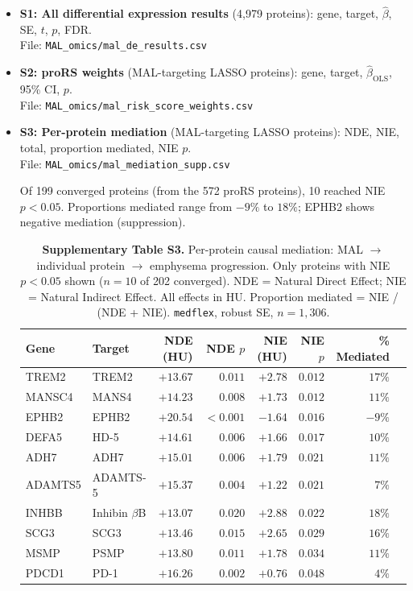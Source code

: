 \documentclass[11pt, letterpaper]{article}
\begin{document}
\begin{itemize}
  \item \textbf{S1: All differential expression results} (4,979
    proteins): gene, target, $\hat\beta$, SE, $t$, $p$, FDR. \\
    File: \texttt{MAL\_omics/mal\_de\_results.csv}

  \item \textbf{S2: proRS weights} (MAL-targeting LASSO proteins): gene, target,
    $\hat\beta_{\text{OLS}}$, 95\% CI, $p$. \\
    File: \texttt{MAL\_omics/mal\_risk\_score\_weights.csv}

  \item \textbf{S3: Per-protein mediation} (MAL-targeting LASSO proteins): NDE, NIE,
    total, proportion mediated, NIE $p$. \\
    File: \texttt{MAL\_omics/mal\_mediation\_supp.csv}

    Of 199 converged proteins (from the 572 proRS proteins), 10 reached
    NIE $p < 0.05$. Proportions mediated range from $-9\%$ to $18\%$;
    EPHB2 shows negative mediation (suppression).

\begin{table}[H]
\centering
\caption*{\textbf{Supplementary Table S3.} Per-protein causal mediation:
  MAL $\to$ individual protein $\to$ emphysema progression. Only proteins
  with NIE $p < 0.05$ shown ($n = 10$ of 202 converged). NDE = Natural
  Direct Effect; NIE = Natural Indirect Effect. All effects in HU.
  Proportion mediated = NIE / (NDE + NIE). \texttt{medflex}, robust SE,
  $n = 1{,}306$.}
\begin{tabular}{llrrrrrr}
\toprule
Gene & Target & NDE (HU) & NDE $p$ & NIE (HU) & NIE $p$ & \% Mediated \\
\midrule
TREM2    & TREM2            & $+13.67$ & $0.011$ & $+2.78$ & $0.012$ & $17\%$ \\
MANSC4   & MANS4            & $+14.23$ & $0.008$ & $+1.73$ & $0.012$ & $11\%$ \\
EPHB2    & EPHB2            & $+20.54$ & $<0.001$ & $-1.64$ & $0.016$ & $-9\%$ \\
DEFA5    & HD-5             & $+14.61$ & $0.006$ & $+1.66$ & $0.017$ & $10\%$ \\
ADH7     & ADH7             & $+15.01$ & $0.006$ & $+1.79$ & $0.021$ & $11\%$ \\
ADAMTS5  & ADAMTS-5         & $+15.37$ & $0.004$ & $+1.22$ & $0.021$ & $7\%$  \\
INHBB    & Inhibin $\beta$B & $+13.07$ & $0.020$ & $+2.88$ & $0.022$ & $18\%$ \\
SCG3     & SCG3             & $+13.46$ & $0.015$ & $+2.65$ & $0.029$ & $16\%$ \\
MSMP     & PSMP             & $+13.80$ & $0.011$ & $+1.78$ & $0.034$ & $11\%$ \\
PDCD1    & PD-1             & $+16.26$ & $0.002$ & $+0.76$ & $0.048$ & $4\%$  \\
\bottomrule
\end{tabular}
\end{table}
\end{itemize}
\end{document}
